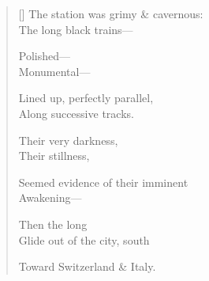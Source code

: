 \label{ch:gare_du_lyon}
\settowidth{\versewidth}{The station was grimy \& cavernous:}
\begin{verse}[\versewidth]
The station was grimy \& cavernous:\\
The long black trains---

Polished---\\
Monumental---

Lined up, perfectly parallel,\\
Along successive tracks.

Their very darkness,\\
Their stillness,

Seemed evidence of their imminent\\
Awakening---

Then the long\\
Glide out of the city, south

Toward Switzerland \& Italy.
\end{verse}
